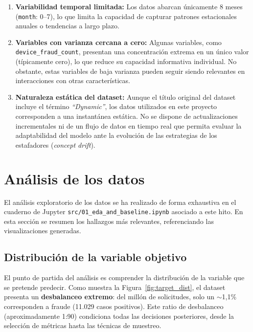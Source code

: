 \documentclass[12pt,a4paper]{report}
\begin{document}
\begin{enumerate}
    \item \textbf{Variabilidad temporal limitada:} Los datos abarcan únicamente 8 meses (\texttt{month}: 0--7), lo que limita la capacidad de capturar patrones estacionales anuales o tendencias a largo plazo.

    \item \textbf{Variables con varianza cercana a cero:} Algunas variables, como \texttt{device\_fraud\_count}, presentan una concentración extrema en un único valor (típicamente cero), lo que reduce su capacidad informativa individual. No obstante, estas variables de baja varianza pueden seguir siendo relevantes en interacciones con otras características.

    \item \textbf{Naturaleza estática del dataset:} Aunque el título original del dataset incluye el término \textit{``Dynamic''}, los datos utilizados en este proyecto corresponden a una instantánea estática. No se dispone de actualizaciones incrementales ni de un flujo de datos en tiempo real que permita evaluar la adaptabilidad del modelo ante la evolución de las estrategias de los estafadores (\textit{concept drift}).
\end{enumerate}

\section{Análisis de los datos}
\label{sec:h2_analisis}

El análisis exploratorio de los datos se ha realizado de forma exhaustiva en el cuaderno de Jupyter \texttt{src/01\_eda\_and\_baseline.ipynb} asociado a este hito. En esta sección se resumen los hallazgos más relevantes, referenciando las visualizaciones generadas.

\subsection{Distribución de la variable objetivo}

El punto de partida del análisis es comprender la distribución de la variable que se pretende predecir. Como muestra la Figura~\ref{fig:target_dist}, el dataset presenta un \textbf{desbalanceo extremo}: del millón de solicitudes, solo un $\sim$1,1\% corresponden a fraude (11.029 casos positivos). Este ratio de desbalanceo (aproximadamente 1:90) condiciona todas las decisiones posteriores, desde la selección de métricas hasta las técnicas de muestreo.
\end{document}
